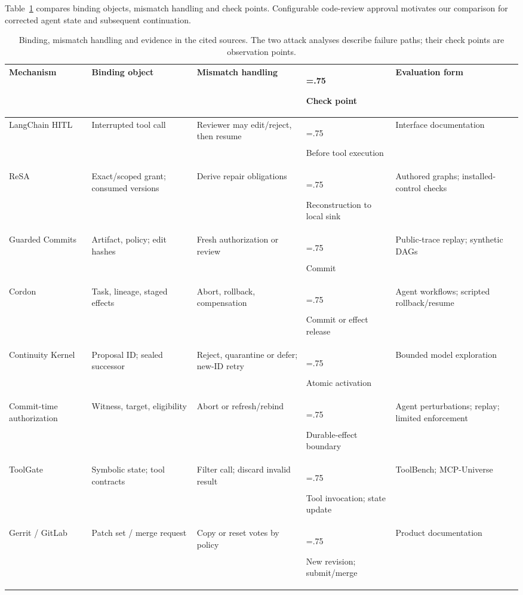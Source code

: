 \documentclass[pdflatex,sn-basic]{sn-jnl}
\begin{document}
Table~\ref{tab:related} compares binding objects, mismatch handling and check points. Configurable code-review approval \citep{gerrit-copy-condition,gitlab-approvals} motivates our comparison for corrected agent state and subsequent continuation.

\begin{table}[tbp]
\caption{Binding, mismatch handling and evidence in the cited sources. The two attack analyses describe failure paths; their check points are observation points.}\label{tab:related}
\centering\footnotesize
\setlength{\tabcolsep}{2.5pt}
\renewcommand{\arraystretch}{1.05}
\begin{tabularx}{\textwidth}{@{}>{\hsize=1.05\hsize\raggedright\arraybackslash}X>{\hsize=1.0\hsize\raggedright\arraybackslash}X>{\hsize=1.05\hsize\raggedright\arraybackslash}X>{\hsize=.75\hsize\raggedright\arraybackslash}X>{\hsize=1.15\hsize\raggedright\arraybackslash}X@{}}
\toprule
Mechanism & Binding object & Mismatch handling & Check point & Evaluation form \\
\midrule
LangChain HITL \citep{langchain-hitl} & Interrupted tool call & Reviewer may edit/reject, then resume & Before tool execution & Interface documentation \\
ReSA \citep{zhu2026resa} & Exact/scoped grant; consumed versions & Derive repair obligations & Reconstruction to local sink & Authored graphs; installed-control checks \\
Guarded Commits \citep{bindschaedler2026guarded} & Artifact, policy; edit hashes & Fresh authorization or review & Commit & Public-trace replay; synthetic DAGs \\
Cordon \citep{cordon} & Task, lineage, staged effects & Abort, rollback, compensation & Commit or effect release & Agent workflows; scripted rollback/resume \\
Continuity Kernel \citep{continuity-kernel} & Proposal ID; sealed successor & Reject, quarantine or defer; new-ID retry & Atomic activation & Bounded model exploration \\
Commit-time authorization \citep{commit-time-auth} & Witness, target, eligibility & Abort or refresh/rebind & Durable-effect boundary & Agent perturbations; replay; limited enforcement \\
ToolGate \citep{toolgate} & Symbolic state; tool contracts & Filter call; discard invalid result & Tool invocation; state update & ToolBench; MCP-Universe \\
Gerrit / GitLab \citep{gerrit-copy-condition,gerrit-submit-requirements,gitlab-approvals} & Patch set / merge request & Copy or reset votes by policy & New revision; submit/merge & Product documentation \\

\end{tabularx}
\end{table}
\end{document}
